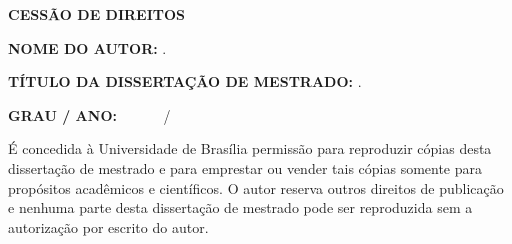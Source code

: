 \begin{fichacatalografica}
		\vspace{6mm}
		
		\noindent  \MakeUppercase{\textbf{Cess\~{a}o de Direitos}} 
		
		\vspace{5mm}
		
		\noindent \textbf{NOME DO AUTOR:} \imprimirautor.
		\vspace{6mm}
		
		\noindent \textbf{T\'{I}TULO DA DISSERTA\c{C}\~{A}O DE MESTRADO:} \imprimirtitulo.
		
		\vspace{3mm}
		\noindent \textbf{GRAU / ANO:}~ ~ ~ \MakeUppercase\imprimirgrau~ / \imprimirano
		
		\vspace{5mm}
		
		\noindent \'{E} concedida \`{a} Universidade de Bras\'{i}lia permiss\~{a}o para reproduzir c\'{o}pias desta disserta\c{c}\~{a}o de mestrado e para emprestar ou vender tais c\'{o}pias somente para prop\'{o}sitos acad\^{e}micos e cient\'{i}ficos. O autor reserva outros direitos de publica\c{c}\~{a}o e nenhuma parte desta disserta\c{c}\~{a}o de mestrado pode ser reproduzida sem a autoriza\c{c}\~{a}o por escrito do autor.
		
		\vspace{10mm}
		
		\noindent \underline{\hspace{65mm}}
		
		\vspace{-2mm}
		
		\noindent  \imprimirautor
		\vspace{-2mm}
		
		\noindent 
		\vspace{-2mm}
		
		\vspace{-2mm}
\end{fichacatalografica}

\newpage